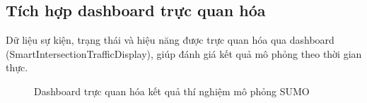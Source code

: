 \subsection{Tích hợp dashboard trực quan hóa}

Dữ liệu sự kiện, trạng thái và hiệu năng được trực quan hóa qua dashboard (SmartIntersectionTrafficDisplay), giúp đánh giá kết quả mô phỏng theo thời gian thực.

\begin{figure}[H]
    \centering
    \caption{Dashboard trực quan hóa kết quả thí nghiệm mô phỏng SUMO}
    \label{fig:sumo_dashboard}
\end{figure}

